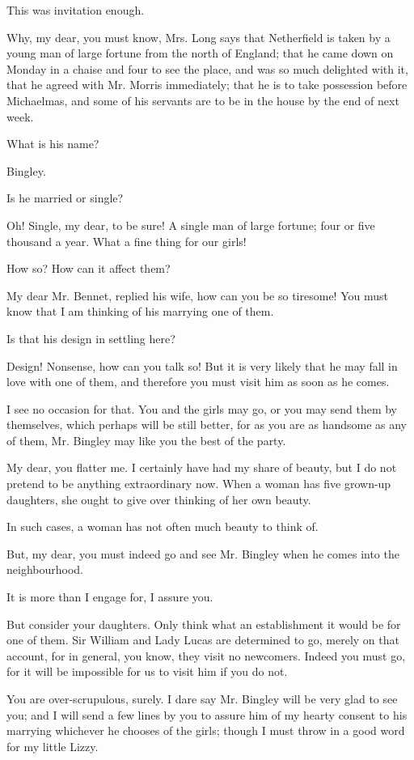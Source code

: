 \documentclass[twocolumn]{article}
\begin{document}
This was invitation enough.

Why, my dear, you must know, Mrs. Long says that Netherfield is taken
by a young man of large fortune from the north of England; that he came
down on Monday in a chaise and four to see the place, and was so much
delighted with it, that he agreed with Mr. Morris immediately; that he
is to take possession before Michaelmas, and some of his servants are to
be in the house by the end of next week.

What is his name?

Bingley.

Is he married or single?

Oh! Single, my dear, to be sure! A single man of large fortune; four or
five thousand a year. What a fine thing for our girls!

How so? How can it affect them?

My dear Mr. Bennet, replied his wife, how can you be so tiresome! You
must know that I am thinking of his marrying one of them.

Is that his design in settling here?

Design! Nonsense, how can you talk so! But it is very likely that he
may fall in love with one of them, and therefore you must visit him as
soon as he comes.

I see no occasion for that. You and the girls may go, or you may send
them by themselves, which perhaps will be still better, for as you are
as handsome as any of them, Mr. Bingley may like you the best of the
party.

My dear, you flatter me. I certainly have had my share of beauty, but
I do not pretend to be anything extraordinary now. When a woman has five
grown-up daughters, she ought to give over thinking of her own beauty.

In such cases, a woman has not often much beauty to think of.

But, my dear, you must indeed go and see Mr. Bingley when he comes into
the neighbourhood.

It is more than I engage for, I assure you.

But consider your daughters. Only think what an establishment it would
be for one of them. Sir William and Lady Lucas are determined to
go, merely on that account, for in general, you know, they visit no
newcomers. Indeed you must go, for it will be impossible for us to
visit him if you do not.

You are over-scrupulous, surely. I dare say Mr. Bingley will be very
glad to see you; and I will send a few lines by you to assure him of my
hearty consent to his marrying whichever he chooses of the girls; though
I must throw in a good word for my little Lizzy.
\end{document}
